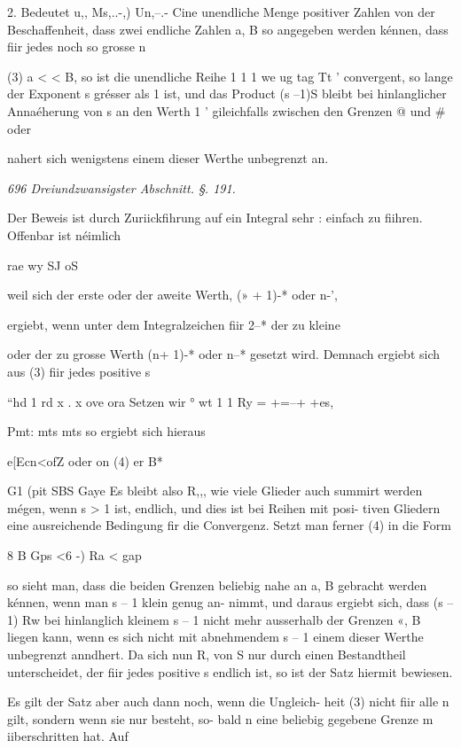 \documentclass[12pt,a4paper]{article}
\theoremstyle{plain}
\theoremstyle{definition}
\begin{document}
2. Bedeutet u,, Ms,..-,) Un,--.- Cine unendliche Menge positiver Zahlen von der Beschaffenheit, dass zwei endliche Zahlen a, B so angegeben werden kénnen, dass fiir jedes noch so grosse n

(3) a < < B, so ist die unendliche Reihe 1 1 1 we ug tag Tt ' convergent, so lange der Exponent s grésser als 1 ist, und das Product (s --1)S bleibt bei hinlanglicher Annaéherung von s an den Werth 1 '  gileichfalls zwischen den Grenzen @ und \# oder

nahert sich wenigstens einem dieser Werthe unbegrenzt an.

\vspace{0.5\baselineskip}\noindent\textit{696 Dreiundzwansigster Abschnitt. §. 191.}\par

Der Beweis ist durch Zuriickfihrung auf ein Integral sehr : einfach zu fiihren. Offenbar ist néimlich

rae wy SJ oS

weil sich der erste oder der aweite Werth, (» + 1)-* oder n-',

ergiebt, wenn unter dem Integralzeichen fiir 2--* der zu kleine

oder der zu grosse Werth (n+ 1)-* oder n--* gesetzt wird. Demnach ergiebt sich aus (3) fiir jedes positive s

``hd 1 rd x . x ove ora Setzen wir ° wt 1 1 Ry = +=--+ +es,

Pmt: mts mts so ergiebt sich hieraus

e[Ecn<ofZ oder on (4) er B*

G1 (pit SBS Gaye Es bleibt also R,,, wie viele Glieder auch summirt werden mégen, wenn s > 1 ist, endlich, und dies ist bei Reihen mit posi- tiven Gliedern eine ausreichende Bedingung fir die Convergenz. Setzt man ferner (4) in die Form

8 B Gps <6 -) Ra < gap

so sieht man, dass die beiden Grenzen beliebig nahe an a, B gebracht werden kénnen, wenn man s -- 1 klein genug an- nimmt, und daraus ergiebt sich, dass (s -- 1) Rw bei hinlanglich kleinem s -- 1 nicht mehr ausserhalb der Grenzen «, B liegen kann, wenn es sich nicht mit abnehmendem s -- 1 einem dieser Werthe unbegrenzt anndhert. Da sich nun R, von S nur durch einen Bestandtheil unterscheidet, der fiir jedes positive s endlich ist, so ist der Satz hiermit bewiesen.

Es gilt der Satz aber auch dann noch, wenn die Ungleich- heit (3) nicht fiir alle n gilt, sondern wenn sie nur besteht, so- bald n eine beliebig gegebene Grenze m iiberschritten hat. Auf
\end{document}
